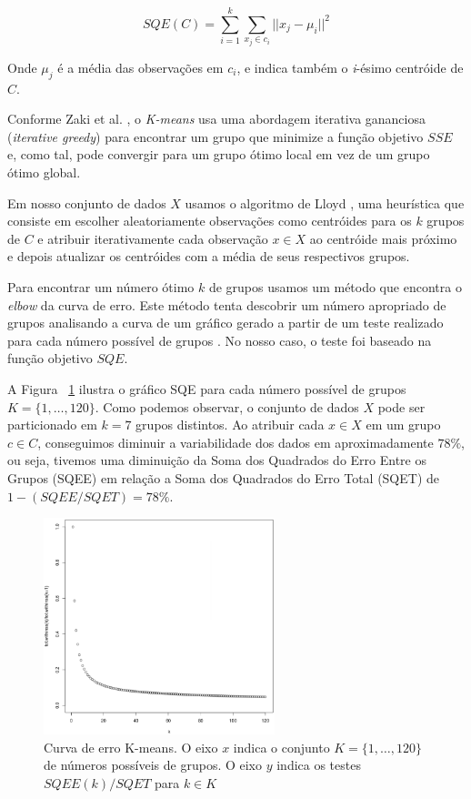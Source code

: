\begin{displaymath}
  SQE(C) = \sum_{i=1}^{k} \sum_{x_j \in c_i}{} || x_j - \mu _i ||^2
\end{displaymath}

Onde $\mu_j$ é a média das observações em $c_i$, e indica também o \textit{i}-ésimo centróide de $C$.

Conforme Zaki et al. \cite{zaki2014data}, o \textit{K-means} usa uma abordagem iterativa gananciosa (\textit{iterative greedy}) para encontrar um grupo que minimize a função objetivo $SSE$ e, como tal, pode convergir para um grupo ótimo local em vez de um grupo ótimo global.

Em nosso conjunto de dados $X$ usamos o algoritmo de Lloyd \cite{ong2015player}, uma heurística que consiste em escolher aleatoriamente observações como centróides para os $k$ grupos de $C$ e atribuir iterativamente cada observação $x \in X$ ao centróide mais próximo e depois atualizar os centróides com a média de seus respectivos grupos.

Para encontrar um número ótimo $k$ de grupos usamos um método que encontra o \textit{elbow} da curva de erro. Este método tenta descobrir um número apropriado de grupos analisando a curva de um gráfico gerado a partir de um teste realizado para cada número possível de grupos \cite{kodinariya2013review}. No nosso caso, o teste foi baseado na função objetivo $SQE$.

A Figura ~\ref{fig:k-means-curve} ilustra o gráfico SQE para cada número possível de grupos $K = \{1, \ldots, 120\}$. Como podemos observar, o conjunto de dados $X$ pode ser particionado em $k=7$ grupos distintos. Ao atribuir cada $x \in X$ em um grupo $c \in C$, conseguimos diminuir a variabilidade dos dados em aproximadamente $78\%$, ou seja, tivemos uma diminuição da Soma dos Quadrados do Erro Entre os Grupos (SQEE) em relação a Soma dos Quadrados do Erro Total (SQET) de $1 - (SQEE/SQET) = 78 \%$.

\begin{figure}
  \centering
  \includegraphics[width=0.6\textwidth]{k-means-curve}%
  \caption{Curva de erro K-means. O eixo $x$ indica o conjunto $K=\{1, \ldots, 120\}$ de números possíveis de grupos. O eixo $y$ indica os testes $SQEE(k)/SQET$ para $k \in K $}
  \label{fig:k-means-curve}
\end{figure}

